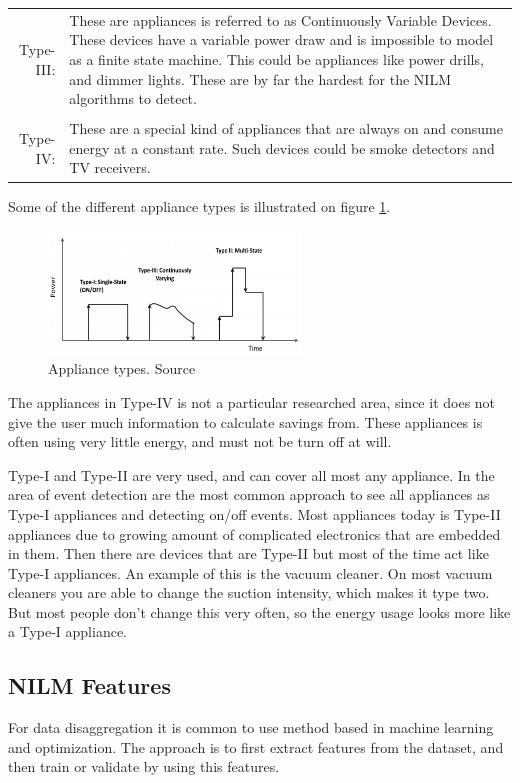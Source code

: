 \begin{tabularx}{\linewidth}{ r X }
Type-III:&These are appliances is referred to as Continuously Variable
Devices. These devices have a variable power draw and is impossible to model as a finite state machine. This could be appliances like power drills, and dimmer lights. These are by far the hardest for the NILM algorithms to detect. \\
\\
Type-IV:& These are a special kind of appliances that are always on and consume energy at a constant rate. Such devices could be smoke detectors and TV receivers.  \\
\end{tabularx}

Some of the different appliance types is illustrated on figure \ref{fig:ATO}. 


\begin{figure}[H]
\centering
\includegraphics[width=0.6\textwidth]{billeder/Types.png}
\caption{Appliance types. Source \citep{RefWorks:17}}
\label{fig:ATO}
\end{figure}

The appliances in Type-IV is not a particular researched area, since it does not give the user much information to calculate savings from. These appliances is often using very little energy, and must not be turn off at will. 

Type-I and Type-II are very used, and can cover all most any appliance. In the area of event detection are the most common approach to see all appliances as Type-I appliances and detecting on/off events. Most appliances today is Type-II appliances due to growing amount of complicated electronics that are embedded in them. Then there are devices that are Type-II but most of the time act like Type-I appliances. An example of this is the vacuum cleaner. On most vacuum cleaners you are able to change the suction intensity, which makes it type two. But most people don't change this very often, so the energy usage looks more like a Type-I appliance. 
 
\subsection{NILM Features} 
For data disaggregation it is common to use method based in machine learning and optimization. The approach is to first extract features from the dataset, and then train or validate by using this features. 

